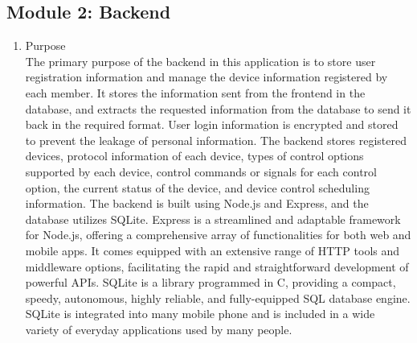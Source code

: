 \documentclass[conference]{IEEEtran}
\begin{document}
\subsection{\large{Module 2: Backend}}
\begin{enumerate}[label=\arabic*.]
\item Purpose\\
The primary purpose of the backend in this application is to store user registration information and manage the device information registered by each member. It stores the information sent from the frontend in the database, and extracts the requested information from the database to send it back in the required format. User login information is encrypted and stored to prevent the leakage of personal information. The backend stores registered devices, protocol information of each device, types of control options supported by each device, control commands or signals for each control option, the current status of the device, and device control scheduling information. The backend is built using Node.js and Express, and the database utilizes SQLite. Express is a streamlined and adaptable framework for Node.js, offering a comprehensive array of functionalities for both web and mobile apps. It comes equipped with an extensive range of HTTP tools and middleware options, facilitating the rapid and straightforward development of powerful APIs. SQLite is a library programmed in C, providing a compact, speedy, autonomous, highly reliable, and fully-equipped SQL database engine. SQLite is integrated into many mobile phone and is included in a wide variety of everyday applications used by many people.\\


\end{enumerate}
\end{document}
